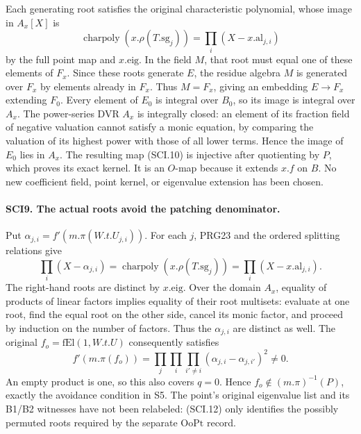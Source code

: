 Each generating root satisfies the original characteristic
polynomial, whose image in \(A_x[X]\) is
\[
 \operatorname{charpoly}(x.\rho(T.\mathrm{sg}_j))
       =\prod_i(X-x.\mathrm{al}_{j,i})                    \tag{SCI.11}
\]
by the full point map and \(x.\mathrm{eig}\). In the field
\(M\), that root must equal one of these elements of \(F_x\).
Since these roots generate \(E\), the residue algebra \(M\)
is generated over \(F_x\) by elements already in \(F_x\).
Thus \(M=F_x\), giving an embedding \(E\to F_x\)
extending \(F_0\). Every element of \(E_0\) is integral
over \(B_0\), so its image is integral over \(A_x\).
The power-series DVR \(A_x\) is integrally closed: an element
of its fraction field of negative valuation cannot satisfy a
monic equation, by comparing the valuation of its highest power
with those of all lower terms. Hence the image of \(E_0\)
lies in \(A_x\). The resulting map (SCI.10) is injective
after quotienting by \(P\), which proves its exact kernel.
It is an \(O\)-map because it extends \(x.f\) on \(B\).
No new coefficient field, point kernel, or eigenvalue extension
has been chosen.

\paragraph{SCI9. The actual roots avoid the patching denominator.}
\label{claim:SCI9}
Put \(\alpha_{j,i}=f'(m.\pi(W.t.U_{j,i}))\).
For each \(j\), PRG23 and the ordered splitting relations give
\[
 \prod_i(X-\alpha_{j,i})
   =\operatorname{charpoly}(x.\rho(T.\mathrm{sg}_j))
   =\prod_i(X-x.\mathrm{al}_{j,i}).                        \tag{SCI.12}
\]
The right-hand roots are distinct by \(x.\mathrm{eig}\).
Over the domain \(A_x\), equality of products of linear factors
implies equality of their root multisets: evaluate at one root,
find the equal root on the other side, cancel its monic factor,
and proceed by induction on the number of factors. Thus the
\(\alpha_{j,i}\) are distinct as well. The original
\(f_o=\mathrm{fEl}(1,W.t.U)\) consequently satisfies
\[
 f'(m.\pi(f_o))
   =\prod_j\prod_i\prod_{i'\ne i}
          (\alpha_{j,i}-\alpha_{j,i'})^2\ne0.              \tag{SCI.13}
\]
An empty product is one, so this also covers \(q=0\).
Hence \(f_o\notin(m.\pi)^{-1}(P)\), exactly the avoidance
condition in S5. The point's original eigenvalue list and its
B1/B2 witnesses have not been relabeled: (SCI.12) only identifies
the possibly permuted roots required by the separate
\(\mathrm{OoPt}\) record.


